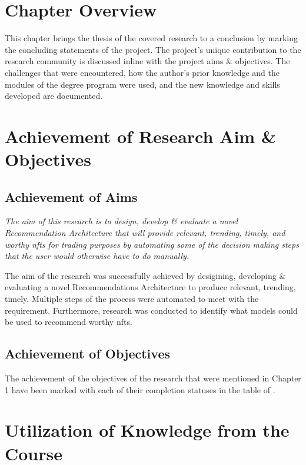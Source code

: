 \section{Chapter Overview}
This chapter brings the thesis of the covered research to a conclusion by marking the concluding statements of the project. The project's unique contribution to the research community is discussed inline with the project aims \& objectives. The challenges that were encountered, how the author's prior knowledge and the modules of the degree program were used, and the new knowledge and skills developed are documented.


\section{Achievement of Research Aim \& Objectives}

\subsection{Achievement of Aims}
\textit{The aim of this research is to design, develop \& evaluate a novel Recommendation Architecture that will provide relevant, trending, timely, and worthy \gls{nft}s for trading purposes by automating some of the decision making steps that the user would otherwise have to do manually.}

The aim of the research was successfully achieved by desigining, developing \& evaluating a novel Recommendations Architecture to produce relevant, trending, timely. Multiple steps of the process were automated to meet with the requirement. Furthermore, research was conducted to identify what models could be used to recommend worthy \gls{nft}s.

\subsection{Achievement of Objectives}
The achievement of the objectives of the research that were mentioned in Chapter 1 have been marked with each of their completion statuses in the  table of \textit{}.


\section{Utilization of Knowledge from the Course}



